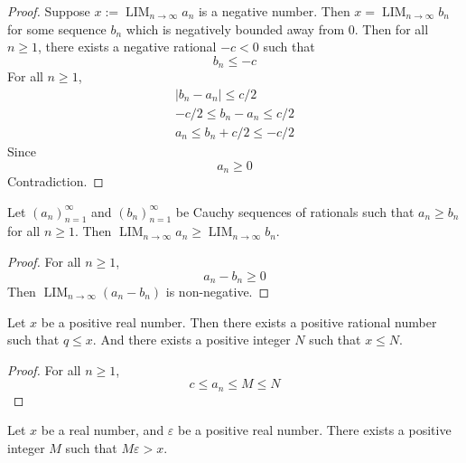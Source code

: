 \documentclass{blog}
\DeclareMathOperator{\LIM}{LIM}
\begin{document}
\begin{proof}
  Suppose $x := \LIM_{n \to \infty} a_{n}$ is a negative number.
  Then $x = \LIM_{n \to \infty} b_{n}$ for some sequence $b_{n}$
  which is negatively bounded away from 0.
  Then for all $n \geq 1$, there exists a negative rational $-c < 0$ such that
  \begin{equation*}
    b_{n} \leq -c
  \end{equation*}
  For all $n \geq 1$,
  \begin{gather*}
    |b_{n} - a_{n}| \leq c / 2 \\
    -c / 2 \leq b_{n} - a_{n} \leq c / 2 \\
    a_{n} \leq b_{n} + c / 2 \leq - c / 2
  \end{gather*}
  Since
  \begin{equation*}
    a_{n} \geq 0
  \end{equation*}
  Contradiction.
\end{proof}

\begin{proposition}
  Let $(a_{n})_{n = 1}^{\infty}$ and $(b_{n})_{n = 1}^{\infty}$ be Cauchy sequences
  of rationals such that $a_{n} \geq b_{n}$ for all $n \geq 1$.
  Then $\LIM_{n \to \infty} a_{n} \geq \LIM_{n \to \infty} b_{n}$.
\end{proposition}

\begin{proof}
  For all $n \geq 1$,
  \begin{equation*}
    a_{n} - b_{n} \geq 0
  \end{equation*}
  Then $\LIM_{n \to \infty} (a_{n} - b_{n})$ is non-negative.
\end{proof}

\begin{proposition}
  \label{RPOP:BOUNDING_OF_REALS}
  Let $x$ be a positive real number.
  Then there exists a positive rational number such that $q \leq x$.
  And there exists a positive integer $N$ such that $x \leq N$.
\end{proposition}

\begin{proof}
  For all $n \geq 1$,
  \begin{equation*}
    c \leq a_{n} \leq M \leq N
  \end{equation*}
\end{proof}

\begin{proposition}
  \label{PROP:ARCHIMENDEAN_PROPERTY}
  Let $x$ be a real number, and $\varepsilon$ be
  a positive real number.
  There exists a positive integer $M$ such that $M \varepsilon > x$.
\end{proposition}
\end{document}
